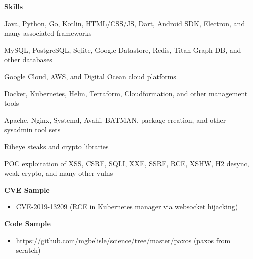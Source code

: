 \documentclass[10pt, a4paper]{article}
\begin{document}
\textbf{Skills}
\begin{itemize*}
  \item Java, Python, Go, Kotlin, HTML/CSS/JS, Dart, Android SDK, Electron, and many associated frameworks
  \item MySQL, PostgreSQL, Sqlite, Google Datastore, Redis, Titan Graph DB, and other databases
  \item Google Cloud, AWS, and Digital Ocean cloud platforms
  \item Docker, Kubernetes, Helm, Terraform, Cloudformation, and other management tools
  \item Apache, Nginx, Systemd, Avahi, BATMAN, package creation, and other sysadmin tool sets
  \item Ribeye steaks and crypto libraries
  \item POC exploitation of XSS, CSRF, SQLI, XXE, SSRF, RCE, XSHW, H2 desync, weak crypto, and many other vulns
\end{itemize*}
\textbf{CVE Sample}
\begin{itemize}
  \item[] \href{https://cve.mitre.org/cgi-bin/cvename.cgi?name=CVE-2019-13209}{CVE-2019-13209} (RCE in Kubernetes manager via websocket hijacking)
\end{itemize}
\textbf{Code Sample}
\begin{itemize}
  \item[] \url{https://github.com/mgbelisle/science/tree/master/paxos} (paxos from scratch)
\end{itemize}
\end{document}
